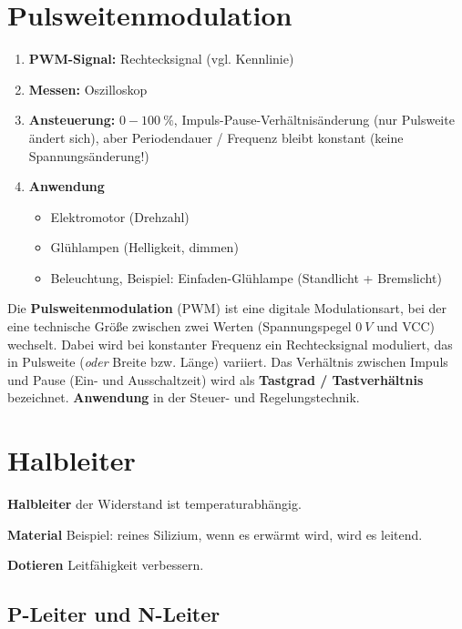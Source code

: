 \section{Pulsweitenmodulation}\label{pulsweitenmodulation}

\begin{enumerate}
\item
  \textbf{PWM-Signal:} Rechtecksignal (vgl. Kennlinie)
\item
  \textbf{Messen:} Oszilloskop
\item
  \textbf{Ansteuerung:} $0 - 100~\%$, Impuls-Pause-Verhältnisänderung
  (nur Pulsweite ändert sich), aber Periodendauer / Frequenz bleibt
  konstant (keine Spannungsänderung!)
\item
  \textbf{Anwendung}

  \begin{itemize}
  \item
    Elektromotor (Drehzahl)
  \item
    Glühlampen (Helligkeit, dimmen)
  \item
    Beleuchtung, Beispiel: Einfaden-Glühlampe (Standlicht + Bremslicht)
  \end{itemize}
\end{enumerate}

Die \textbf{Pulsweitenmodulation} (PWM) ist eine digitale
Modulationsart, bei der eine technische Größe zwischen zwei Werten
(Spannungspegel $0~V$ und VCC) wechselt. Dabei wird bei konstanter
Frequenz ein Rechtecksignal moduliert, das in Pulsweite (\emph{oder}
Breite bzw. Länge) variiert. Das Verhältnis zwischen Impuls und Pause
(Ein- und Ausschaltzeit) wird als \textbf{Tastgrad / Tastverhältnis}
bezeichnet. \textbf{Anwendung} in der Steuer- und Regelungstechnik.

\section{Halbleiter}\label{halbleiter}

\textbf{Halbleiter} der Widerstand ist temperaturabhängig.

\textbf{Material} Beispiel: reines Silizium, wenn es erwärmt wird, wird
es leitend.

\textbf{Dotieren} Leitfähigkeit verbessern.

\subsection{P-Leiter und N-Leiter}\label{p-leiter-und-n-leiter}

